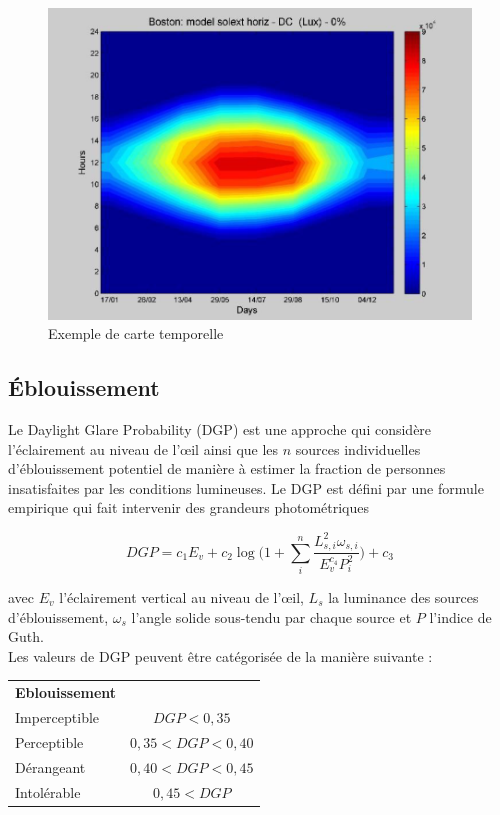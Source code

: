 \documentclass[11pt]{report}
\begin{document}
\begin{figure}[h]
\centering
\includegraphics[scale=0.5]{bos}
\caption{Exemple de carte temporelle}
\end{figure}



\subsection{Éblouissement}
Le Daylight Glare Probability (DGP) est une approche qui considère l'éclairement au niveau de l'œil ainsi que les $n$ sources individuelles d'éblouissement potentiel de manière à estimer la fraction de personnes insatisfaites par les conditions lumineuses. Le DGP est défini par une formule empirique qui fait intervenir des grandeurs photométriques 

$$DGP = c_1 E_v + c_2 \log \Bigg( 1 + \sum_i^n \frac{L^2_{s,i} \omega_{s,i}}{E_v^{c_4} P^2_i}\Bigg) + c_3$$
 
 avec $E_v$ l'éclairement vertical au niveau de l'œil, $L_s$  la luminance des sources d'éblouissement, $\omega_s$ l'angle solide sous-tendu par chaque source et $P$ l'indice de Guth. \\
 
 Les valeurs de DGP peuvent être catégorisée de la manière suivante :
 
 \begin{center}
 \begin{tabular}{lc}
 \textbf{Eblouissement}&\\
 Imperceptible & $DGP < 0,35$\\
 Perceptible & $0,35 < DGP < 0,40$\\
 Dérangeant & $0,40 < DGP < 0,45$\\
 Intolérable & $0,45 < DGP$\\
 \end{tabular}
 \end{center}
\end{document}
